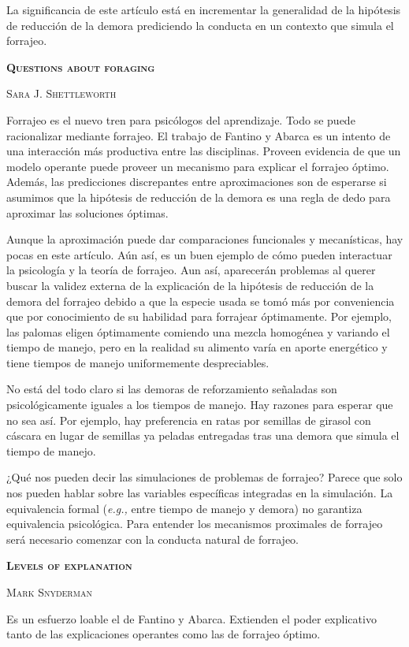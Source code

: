 \documentclass[a4paper,12pt]{article}
\begin{document}
La significancia de este artículo está en incrementar la generalidad de la hipótesis de reducción de la demora prediciendo la conducta en un contexto que simula el forrajeo.

{\scshape\bfseries Questions about foraging}

{\scshape Sara J. Shettleworth}

Forrajeo es el nuevo tren para psicólogos del aprendizaje. Todo se puede racionalizar mediante forrajeo. El trabajo de Fantino y Abarca es un intento de una interacción más productiva entre las disciplinas. Proveen evidencia de que un modelo operante puede proveer un mecanismo para explicar el forrajeo óptimo. Además, las predicciones discrepantes entre aproximaciones son de esperarse si asumimos que la hipótesis de reducción de la demora es una regla de dedo para aproximar las soluciones óptimas.

Aunque la aproximación puede dar comparaciones funcionales y mecanísticas, hay pocas en este artículo. Aún así, es un buen ejemplo de cómo pueden interactuar la psicología y la teoría de forrajeo. Aun así, aparecerán problemas al querer buscar la validez externa de la explicación de la hipótesis de reducción de la demora del forrajeo debido a que la especie usada se tomó más por conveniencia que por conocimiento de su habilidad para forrajear óptimamente. Por ejemplo, las palomas eligen óptimamente comiendo una mezcla homogénea y variando el tiempo de manejo, pero en la realidad su alimento varía en aporte energético y tiene tiempos de manejo uniformemente despreciables. 

No está del todo claro si las demoras de reforzamiento señaladas son psicológicamente iguales a los tiempos de manejo. Hay razones para esperar que no sea así. Por ejemplo, hay preferencia en ratas por semillas de girasol con cáscara en lugar de semillas ya peladas entregadas tras una demora que simula el tiempo de manejo.

¿Qué nos pueden decir las simulaciones de problemas de forrajeo? Parece que solo nos pueden hablar sobre las variables específicas integradas en la simulación. La equivalencia formal ({\itshape e.g.,} entre tiempo de manejo y demora) no garantiza equivalencia psicológica. Para entender los mecanismos proximales de forrajeo será necesario comenzar con la conducta natural de forrajeo.

{\scshape\bfseries Levels of explanation}

{\scshape Mark Snyderman}

Es un esfuerzo loable el de Fantino y Abarca. Extienden el poder explicativo tanto de las explicaciones operantes como las de forrajeo óptimo. 
\end{document}
